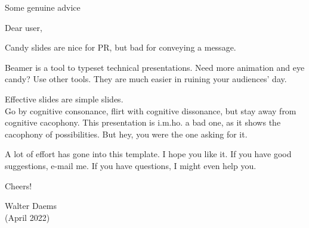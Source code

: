 \documentclass[aspectratio=1610]{beamer}
\begin{document}
\begin{frame}
  {Some genuine advice}
  \small

  Dear user,

  Candy slides are nice for PR, but bad for conveying a message.

  Beamer is a tool to typeset technical presentations. Need more
  animation and eye candy? Use other tools. They are much easier in
  ruining your audiences' day.

  Effective slides are simple slides.\\
  Go by cognitive consonance, flirt with cognitive dissonance, but
  stay away from cognitive cacophony.
  This presentation is i.m.ho. a bad one, as it shows the
  cacophony of possibilities. But hey, you were the one asking for it.

  A lot of effort has gone into this template. I hope you like it.
  If you have good suggestions, e-mail me. If you have questions, I
  might even help you.

  Cheers!

  Walter Daems\\
  (April 2022)

\end{frame}
\end{document}
